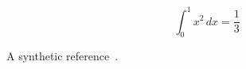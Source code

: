 \documentclass{article}
\begin{document}
\[\int_0^1 x^2\,dx=\frac13\]
A synthetic reference~\cite{sample}.

\end{document}
